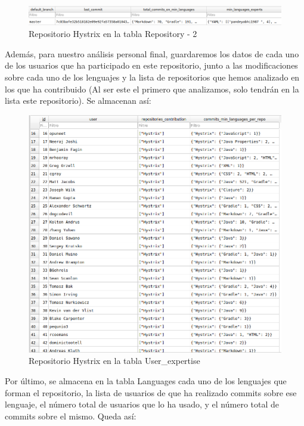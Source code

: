 \documentclass[a4paper, 12pt]{book}
\begin{document}
\begin{figure}[H]
  \centering
  \includegraphics[width=1\textwidth]{img/HYSTRIXBBDD2.png}
  \caption{Repositorio Hystrix en la tabla Repository - 2} 
  \label{figura:hystrixbbdd2}
\end{figure}


Además, para nuestro análisis personal final, guardaremos los datos de cada uno de los usuarios que ha participado en este repositorio, junto a las modificaciones sobre cada uno de los lenguajes y la lista de repositorios que hemos analizado en los que ha contribuido (Al ser este el primero que analizamos, solo tendrán en la lista este repositorio). Se almacenan así:

\begin{figure}[H]
  \centering
  \includegraphics[width=1\textwidth]{img/hystrixuserexpertise.png}
  \caption{Repositorio Hystrix en la tabla User\_expertise}
  \label{figura:hystrixuserexpertise}
\end{figure}

Por último, se almacena en la tabla Languages cada uno de los lenguajes que forman el repositorio, la lista de usuarios de que ha realizado commits sobre ese lenguaje, el número total de usuarios que lo ha usado, y el número total de commits sobre el mismo. Queda así:
\end{document}
